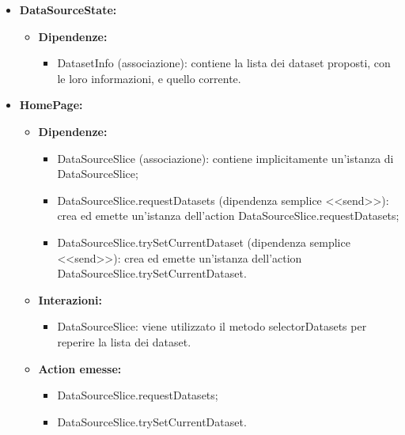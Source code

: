 \begin{itemize}
    \item \textbf{DataSourceState:}
          \begin{itemize}
              \item \textbf{Dipendenze:}
                    \begin{itemize}
                        \item DatasetInfo (associazione): contiene la lista dei dataset proposti, con le loro
                              informazioni, e quello corrente.
                    \end{itemize}
          \end{itemize}

    \item \textbf{HomePage:}
          \begin{itemize}
              \item \textbf{Dipendenze:}
                    \begin{itemize}
                        \item DataSourceSlice (associazione): contiene implicitamente un'istanza di
                              DataSourceSlice;
                        \item DataSourceSlice.requestDatasets (dipendenza semplice <<send>>): crea ed emette
                              un'istanza dell'action DataSourceSlice.requestDatasets;
                        \item DataSourceSlice.trySetCurrentDataset (dipendenza semplice <<send>>): crea ed
                              emette un'istanza dell'action DataSourceSlice.trySetCurrentDataset.
                    \end{itemize}
              \item \textbf{Interazioni:}
                    \begin{itemize}
                        \item DataSourceSlice: viene utilizzato il metodo selectorDatasets per reperire la
                              lista dei dataset.
                    \end{itemize}
              \item \textbf{Action emesse:}
                    \begin{itemize}
                        \item DataSourceSlice.requestDatasets;
                        \item DataSourceSlice.trySetCurrentDataset.
                    \end{itemize}
          \end{itemize}


\end{itemize}
